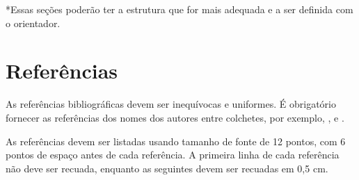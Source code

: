 \documentclass[12pt]{article}
\begin{document}
*Essas seções poderão ter a estrutura que for mais adequada e a ser definida com o orientador.

\section{Referências}

As referências bibliográficas devem ser inequívocas e uniformes. É obrigatório fornecer as referências dos nomes dos autores entre colchetes, por exemplo, \cite{knuth:84}, \cite{boulic:91} e \cite{smith:99}.

As referências devem ser listadas usando tamanho de fonte de 12 pontos, com 6 pontos de espaço antes de cada referência. A primeira linha de cada referência não deve ser recuada, enquanto as seguintes devem ser recuadas em 0,5 cm.



\end{document}
